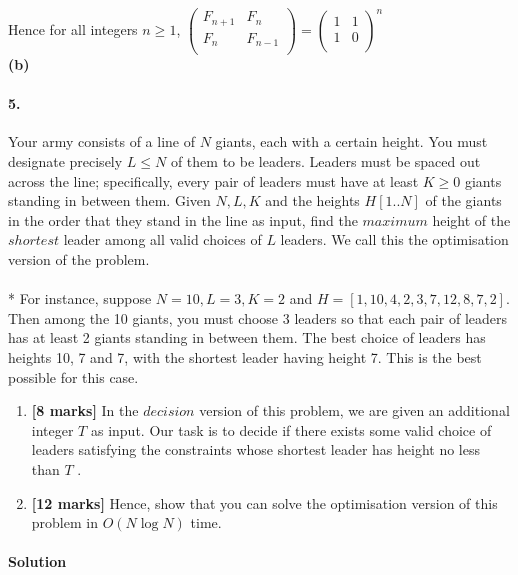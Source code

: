 \documentclass[a4paper]{scrartcl}
\begin{document}
Hence for all integers $n \geq 1$, 
$\begin{pmatrix}
  F_{n+1} & F_n \\
  F_n & F_{n-1} \\
 \end{pmatrix}
 =
 \begin{pmatrix}
   1 & 1 \\
   1 & 0 \\
 \end{pmatrix}^{\!n}$\\
 {\bfseries(b)}
\paragraph{5.}
\label{sec:Question 5}
Your army consists of a line of $N$ giants, each with a certain height. You must designate precisely $L \leq N$ of them to be leaders. Leaders must be spaced out across the line; specifically, every pair of leaders must have at least $K \geq 0$ giants standing in between them. Given $N,L,K$ and the heights $H[1..N]$ of the giants in the order that they stand in the line as input, find the $maximum$ height of the $shortest$ leader among all valid choices of $L$ leaders. We call this the optimisation version of the problem.\\
\\*
For instance, suppose $N = 10,L = 3,K = 2$ and $H = [1,10,4,2,3,7,12,8,7,2].$ Then among the 10 giants, you must choose 3 leaders so that each pair of leaders has at least 2 giants standing in between them. The best choice of leaders has heights 10, 7 and 7, with the shortest leader having height 7. This is the best possible for this case.
\begin{enumerate}[label=(\alph*)]
  \item {\bfseries[8 marks]} In the $decision$ version of this problem, we are given an additional integer $T$ as input. Our task is to decide if there exists some valid choice of leaders satisfying the constraints whose shortest leader has height no less than $T$ .
  \item {\bfseries[12 marks]} Hence, show that you can solve the optimisation version of this problem in $O(N\log{N})$ time.
\end{enumerate}
\paragraph{Solution}
\end{document}
